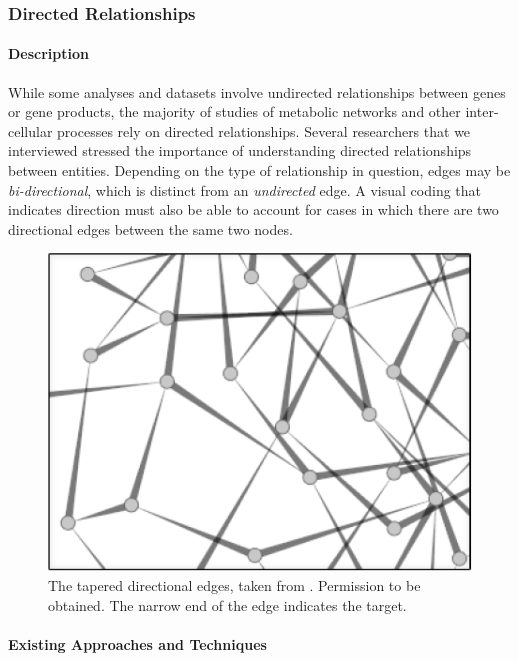 \subsubsection*{Directed Relationships}

\paragraph*{Description}

While some analyses and datasets involve undirected relationships between genes or gene products, the majority of studies of metabolic networks and other inter-cellular processes rely on directed relationships.
Several researchers that we interviewed stressed the importance of understanding directed relationships between entities.
Depending on the type of relationship in question, edges may be \textit{bi-directional}, which is distinct from an \textit{undirected} edge.
A visual coding that indicates direction must also be able to account for cases in which there are two directional edges between the same two nodes.

\begin{figure}[htb]
  \centering
  \includegraphics[width=0.8\columnwidth]{figures/tapered_edges}
  \caption{\label{fig:tapered_edges} The tapered directional edges, taken from \cite{Holten2009}. Permission to be obtained. The narrow end of the edge indicates the target.}
\end{figure}

\paragraph*{Existing Approaches and Techniques}

